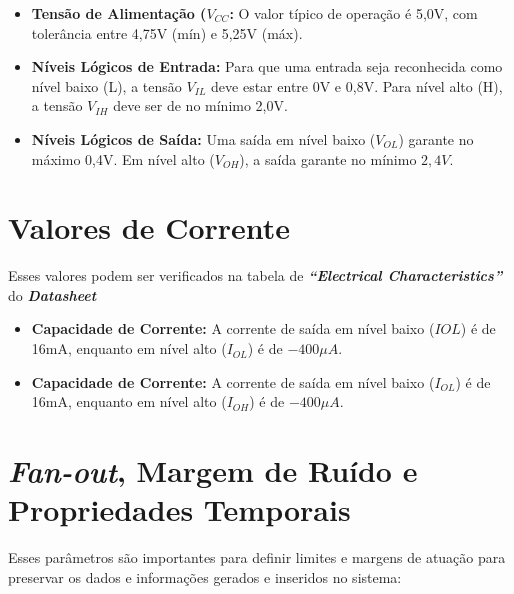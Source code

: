 \documentclass[11pt]{report}         %
\begin{document}
  \begin{itemize}

    \item \textbf{Tensão de Alimentação ($V_{CC}$:} O valor típico de operação é 5,0V, com tolerância entre 4,75V (mín) e 5,25V (máx).

    \item \textbf{Níveis Lógicos de Entrada:} Para que uma entrada seja reconhecida como nível baixo (L), a tensão $V_{IL}$ deve estar entre 0V e 0,8V. 
    Para nível alto (H), a tensão $V_{IH}$ deve ser de no mínimo 2,0V. 

    \item \textbf{Níveis Lógicos de Saída:} Uma saída em nível baixo ($V_{OL}$) garante no máximo 0,4V. Em nível alto ($V_{OH}$), a saída garante no mínimo $2,4V$. 
    
    \end{itemize}

\section{Valores de Corrente}

   Esses valores podem ser verificados na tabela de \textbf{\textit{``Electrical Characteristics''}} do \textbf{\textit{Datasheet}}

  \begin{itemize}
    
    \item \textbf{Capacidade de Corrente:} A corrente de saída em nível baixo ($I{OL}$) é de 16mA, enquanto em nível alto ($I_{OL}$) é de $-400\mu A$.
    
    \item \textbf{Capacidade de Corrente:} A corrente de saída em nível baixo ($I_{OL}$) é de 16mA, enquanto em nível alto ($I_{OH}$) é de $-400\mu A$.

  \end{itemize}

\section{\textbf{\textit{Fan-out}}, Margem de Ruído e Propriedades Temporais}

  Esses parâmetros são importantes para definir limites e margens de atuação para preservar os dados e informações gerados e inseridos no sistema:
\end{document}
